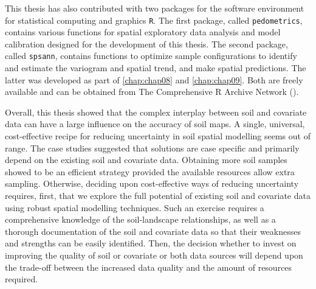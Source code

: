 This thesis has also contributed with two packages for the software environment for statistical computing and 
graphics \texttt{R}. The first package, called \texttt{pedometrics}, contains various functions for spatial 
exploratory data analysis and model calibration designed for the development of this thesis. The second 
package, called \texttt{spsann}, contains functions to optimize sample configurations to identify and estimate 
the variogram and spatial trend, and make spatial predictions. The latter was developed as part of 
\autoref{chap:chap08} and \autoref{chap:chap09}. Both are freely available and can be obtained from The 
Comprehensive R Archive Network (\cran).

Overall, this thesis showed that the complex interplay between soil and covariate data can have a large 
influence on the accuracy of soil maps. A single, universal, cost-effective recipe for reducing uncertainty 
in soil spatial modelling seems out of range. The case studies suggested that solutions are case specific and 
primarily depend on the existing soil and covariate data. Obtaining more soil samples showed to be an efficient 
strategy provided the available resources allow extra sampling. Otherwise, deciding upon cost-effective ways of 
reducing uncertainty requires, first, that we explore the full potential of existing soil and covariate 
data using robust spatial modelling techniques. Such an exercise requires a comprehensive knowledge of the 
soil-landscape relationships, as well as a thorough documentation of the soil and covariate data so that their 
weaknesses and strengths can be easily identified. Then, the decision whether to invest on improving the 
quality of soil or covariate or both data sources will depend upon the trade-off between the increased data 
quality and the amount of resources required.
